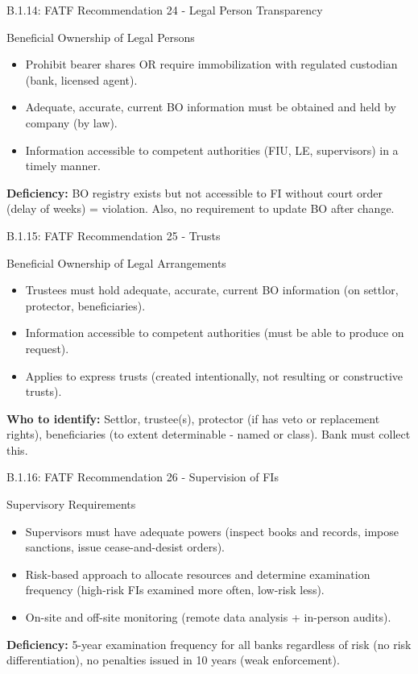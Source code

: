 \documentclass{beamer}
\begin{document}
	\begin{frame}{B.1.14: FATF Recommendation 24 - Legal Person Transparency}
		\begin{block}{Beneficial Ownership of Legal Persons}
			\begin{itemize}
				\item Prohibit bearer shares OR require immobilization with regulated custodian (bank, licensed agent).
				\item Adequate, accurate, current BO information must be obtained and held by company (by law).
				\item Information accessible to competent authorities (FIU, LE, supervisors) in a timely manner.
			\end{itemize}
		\end{block}
		\textbf{Deficiency:} BO registry exists but not accessible to FI without court order (delay of weeks) = violation. Also, no requirement to update BO after change.
	\end{frame}
	
	\begin{frame}{B.1.15: FATF Recommendation 25 - Trusts}
		\begin{block}{Beneficial Ownership of Legal Arrangements}
			\begin{itemize}
				\item Trustees must hold adequate, accurate, current BO information (on settlor, protector, beneficiaries).
				\item Information accessible to competent authorities (must be able to produce on request).
				\item Applies to express trusts (created intentionally, not resulting or constructive trusts).
			\end{itemize}
		\end{block}
		\textbf{Who to identify:} Settlor, trustee(s), protector (if has veto or replacement rights), beneficiaries (to extent determinable - named or class). Bank must collect this.
	\end{frame}
	
	\begin{frame}{B.1.16: FATF Recommendation 26 - Supervision of FIs}
		\begin{block}{Supervisory Requirements}
			\begin{itemize}
				\item Supervisors must have adequate powers (inspect books and records, impose sanctions, issue cease-and-desist orders).
				\item Risk-based approach to allocate resources and determine examination frequency (high-risk FIs examined more often, low-risk less).
				\item On-site and off-site monitoring (remote data analysis + in-person audits).
			\end{itemize}
		\end{block}
		\textbf{Deficiency:} 5-year examination frequency for all banks regardless of risk (no risk differentiation), no penalties issued in 10 years (weak enforcement).
	\end{frame}
	
\end{document}
